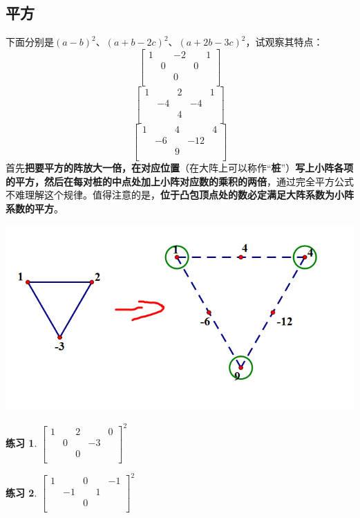 \documentclass[UTF8]{ctexart}
\newtheorem{3}{练习}
\begin{document}
\subsection{平方}
下面分别是$ (a-b)^{2} $、$ (a+b-2c)^{2} $、$ (a+2b-3c)^{2} $，试观察其特点：
\renewcommand*{\arraystretch}{1.732}\[\left[\begin{matrix}
	1& &-2& &1\\
	&0& &0&\\
	& &0& &\\
\end{matrix}\right]\]
\renewcommand*{\arraystretch}{1.732}\[\left[\begin{matrix}
	1& &2& &1\\
	&-4& &-4&\\
	& &4& &\\
\end{matrix}\right]\]
\renewcommand*{\arraystretch}{1.732}\[\left[\begin{matrix}
	1& &4& &4\\
	&-6& &-12&\\
	& &9& &\\
\end{matrix}\right]\]
首先\textbf{把要平方的阵放大一倍，在对应位置}（在大阵上可以称作“\textbf{桩}”）\textbf{写上小阵各项的平方，然后在每对桩的中点处加上小阵对应数的乘积的两倍}，通过完全平方公式不难理解这个规律。值得注意的是，\textbf{位于凸包顶点处的数必定满足大阵系数为小阵系数的平方}。
\begin{center}
	\includegraphics[width=0.5\linewidth]{0280}
\end{center}
\begin{3}
	$ \left[\begin{matrix}
		1& &2& &0\\
		&0& &-3&\\
		& &0& &\\
	\end{matrix}\right]^{2}$
\end{3}
\begin{3}
	$ \left[\begin{matrix}
		1& &0& &-1\\
		&-1& &1&\\
		& &0& &\\
	\end{matrix}\right]^{2} $
\end{3}
\end{document}
